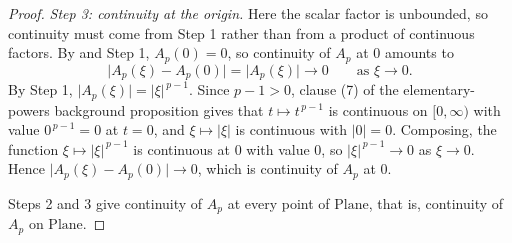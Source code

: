 \begin{proof}
\medskip\noindent\emph{Step 3: continuity at the origin.}
Here the scalar factor is unbounded, so continuity must come from Step 1 rather than from a
product of continuous factors.  By  and Step 1, $A_p(0)=0$, so continuity of
$A_p$ at $0$ amounts to
\[
  \lvert A_p(\xi)-A_p(0)\rvert=\lvert A_p(\xi)\rvert\longrightarrow0
  \qquad\text{as }\xi\to0 .
\]
By Step 1, $\lvert A_p(\xi)\rvert=\lvert\xi\rvert^{\,p-1}$.  Since $p-1>0$, clause (7) of the
elementary-powers background proposition gives that $t\mapsto t^{\,p-1}$ is continuous on
$[0,\infty)$ with value $0^{\,p-1}=0$ at $t=0$, and
$\xi\mapsto\lvert\xi\rvert$ is continuous with $\lvert0\rvert=0$.  Composing, the function
$\xi\mapsto\lvert\xi\rvert^{\,p-1}$ is continuous at $0$ with value $0$, so
$\lvert\xi\rvert^{\,p-1}\to0$ as $\xi\to0$.  Hence
$\lvert A_p(\xi)-A_p(0)\rvert\to0$, which is continuity of $A_p$ at $0$.

\medskip\noindent Steps 2 and 3 give continuity of $A_p$ at every point of $\mathrm{Plane}$,
that is, continuity of $A_p$ on $\mathrm{Plane}$.
\end{proof}

